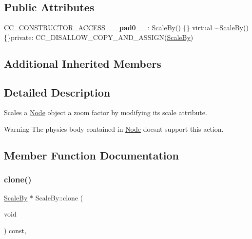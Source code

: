 \subsection*{Public Attributes}
\begin{DoxyCompactItemize}
\item 
\mbox{\label{classScaleBy_a0cff2d37f7895ba094b5ad116ddd4390}} 
\hyperlink{_2cocos2d_2cocos_2base_2ccConfig_8h_a25ef1314f97c35a2ed3d029b0ead6da0}{C\+C\+\_\+\+C\+O\+N\+S\+T\+R\+U\+C\+T\+O\+R\+\_\+\+A\+C\+C\+E\+SS} {\bfseries \+\_\+\+\_\+pad0\+\_\+\+\_\+}\+: \hyperlink{classScaleBy}{Scale\+By}() \{\} virtual $\sim$\hyperlink{classScaleBy}{Scale\+By}() \{\}private\+: C\+C\+\_\+\+D\+I\+S\+A\+L\+L\+O\+W\+\_\+\+C\+O\+P\+Y\+\_\+\+A\+N\+D\+\_\+\+A\+S\+S\+I\+GN(\hyperlink{classScaleBy}{Scale\+By})
\end{DoxyCompactItemize}
\subsection*{Additional Inherited Members}


\subsection{Detailed Description}
Scales a \hyperlink{classNode}{Node} object a zoom factor by modifying it\textquotesingle{}s scale attribute. 

\begin{DoxyWarning}{Warning}
The physics body contained in \hyperlink{classNode}{Node} doesn\textquotesingle{}t support this action. 
\end{DoxyWarning}


\subsection{Member Function Documentation}
\mbox{\label{classScaleBy_a70d07c840c1ad6582695497afe970446}} 
\subsubsection{\texorpdfstring{clone()}{clone()}\hspace{0.1cm}{\footnotesize\ttfamily [1/2]}}
{\footnotesize\ttfamily \hyperlink{classScaleBy}{Scale\+By} $\ast$ Scale\+By\+::clone (\begin{DoxyParamCaption}\item[{void}]{ }\end{DoxyParamCaption}) const\hspace{0.3cm}{\ttfamily [override]}, {\ttfamily [virtual]}}

